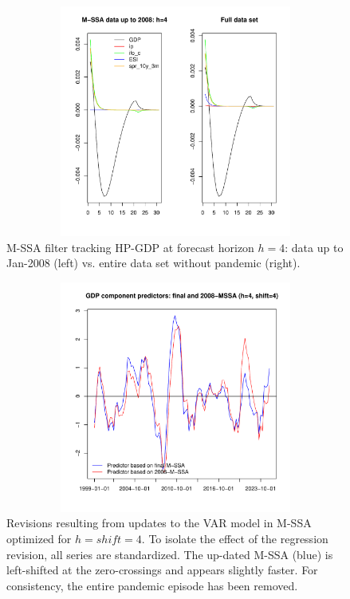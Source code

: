 \documentclass[a4paper]{article}
\begin{document}
\begin{figure}[H]\begin{center}\includegraphics[height=3in, width=5in]{./Figures/bk_2008_all.pdf}\caption{M-SSA filter tracking HP-GDP at forecast horizon $h=4$: data up to Jan-2008 (left) vs. entire data set without pandemic (right).\label{bk_2008_all}}\end{center}\end{figure}

\begin{figure}[H]\begin{center}\includegraphics[height=3in, width=5in]{./Figures/revisions3.pdf}\caption{Revisions resulting from updates to the VAR model in M-SSA optimized for $h=shift=4$. To isolate the effect of the regression revision, all series are standardized. The up-dated M-SSA (blue) is left-shifted at the zero-crossings and appears slightly faster. For consistency, the entire pandemic episode has been removed.\label{revisions3}}\end{center}\end{figure}
\end{document}
